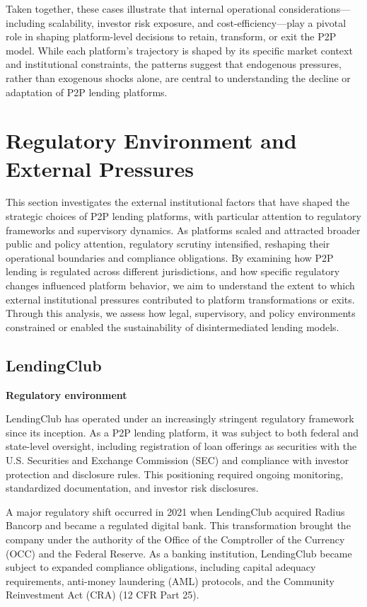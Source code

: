 \documentclass[pdflatex,sn-apa]{sn-jnl}%
\theoremstyle{thmstyleone}%
\theoremstyle{thmstyletwo}%
\theoremstyle{thmstylethree}%
\begin{document}
Taken together, these cases illustrate that internal operational considerations—including scalability, investor risk exposure, and cost-efficiency—play a pivotal role in shaping platform-level decisions to retain, transform, or exit the P2P model. While each platform’s trajectory is shaped by its specific market context and institutional constraints, the patterns suggest that endogenous pressures, rather than exogenous shocks alone, are central to understanding the decline or adaptation of P2P lending platforms.

\section{Regulatory Environment and External Pressures}
This section investigates the external institutional factors that have shaped the strategic choices of P2P lending platforms, with particular attention to regulatory frameworks and supervisory dynamics. As platforms scaled and attracted broader public and policy attention, regulatory scrutiny intensified, reshaping their operational boundaries and compliance obligations. By examining how P2P lending is regulated across different jurisdictions, and how specific regulatory changes influenced platform behavior, we aim to understand the extent to which external institutional pressures contributed to platform transformations or exits. Through this analysis, we assess how legal, supervisory, and policy environments constrained or enabled the sustainability of disintermediated lending models.

\subsection{LendingClub}

\textbf{Regulatory environment}

LendingClub has operated under an increasingly stringent regulatory framework since its inception. As a P2P lending platform, it was subject to both federal and state-level oversight, including registration of loan offerings as securities with the U.S. Securities and Exchange Commission (SEC) and compliance with investor protection and disclosure rules. This positioning required ongoing monitoring, standardized documentation, and investor risk disclosures.

A major regulatory shift occurred in 2021 when LendingClub acquired Radius Bancorp and became a regulated digital bank. This transformation brought the company under the authority of the Office of the Comptroller of the Currency (OCC) and the Federal Reserve. As a banking institution, LendingClub became subject to expanded compliance obligations, including capital adequacy requirements, anti-money laundering (AML) protocols, and the Community Reinvestment Act (CRA) (12 CFR Part 25).
\end{document}
